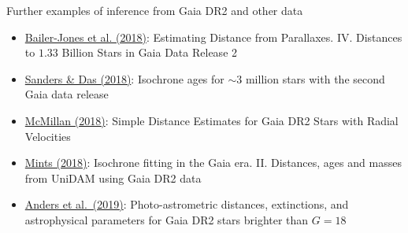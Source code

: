 \documentclass[smaller, aspectratio=169]{beamer}
\begin{document}
\begin{agaframe}{Further examples of inference from Gaia DR2 and other data}
  \begin{itemize}
    \item \href{https://ui.adsabs.harvard.edu/abs/2018AJ....156...58B/abstract}{Bailer-Jones et al.
      (2018)}: Estimating Distance from Parallaxes. IV. Distances to $1.33$ Billion Stars in Gaia
      Data Release 2
    \item \href{https://doi.org/10.1093/mnras/sty2490}{Sanders \& Das (2018)}: Isochrone ages for
      $\sim3$ million stars with the second Gaia data release
    \item \href{https://doi.org/10.3847/2515-5172/aaca93}{McMillan (2018)}: Simple Distance
      Estimates for Gaia DR2 Stars with Radial Velocities
    \item \href{https://arxiv.org/abs/1805.01640}{Mints (2018)}: Isochrone fitting in the Gaia era.
      II. Distances, ages and masses from UniDAM using Gaia DR2 data
    \item \href{https://arxiv.org/abs/1904.11302}{Anders et al.\ (2019)}: Photo-astrometric
      distances, extinctions, and astrophysical parameters for Gaia DR2 stars brighter than $G = 18$
  \end{itemize}

  \medskip
  \centering
\end{agaframe}
%
\end{document}
